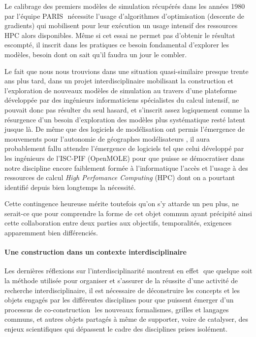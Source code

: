 Le calibrage des premiers modèles de simulation récupérés dans les années 1980 par l'équipe PARIS \autocites{Pumain1983,Pumain1989,Sanders1984}⁠ nécessite l'usage d'algorithmes d'optimisation (descente de gradients) qui mobilisent pour leur exécution un usage intensif des ressources HPC alors disponibles. Même si cet essai ne permet pas d'obtenir le résultat escompté, il inscrit dans les pratiques ce besoin fondamental d'explorer les modèles, besoin dont on sait qu'il faudra un jour le combler. 

Le fait que nous nous trouvions dans une situation quasi-similaire presque trente ans plus tard, dans un projet interdisciplinaire mobilisant la construction et l'exploration de nouveaux modèles de simulation au travers d'une plateforme développée par des ingénieurs informaticiens spécialistes du calcul intensif, ne pouvait donc pas résulter du seul hasard, et s'inscrit assez logiquement comme la résurgence d'un besoin d'exploration des modèles plus systématique resté latent jusque là. De même que des logiciels de modélisation ont permis l'émergence de mouvements pour l'autonomie de géographes modélisateurs \autocite{Banos2013}⁠, il aura probablement fallu attendre l'émergence de logiciels tel que celui développé par les ingénieurs de l'ISC-PIF (OpenMOLE) pour que puisse se démocratiser dans notre discipline encore faiblement formée à l'informatique l'accès et l'usage à des ressources de calcul \textit{High Perfomance Computing} (HPC) dont on a pourtant identifié depuis bien longtemps la nécessité. 

Cette contingence heureuse mérite toutefois qu'on s'y attarde un peu plus, ne serait-ce que pour comprendre la forme de cet objet commun ayant précipité ainsi cette collaboration entre deux parties aux objectifs, temporalités, exigences apparemment bien différenciés. 

\paragraph*{Une construction dans un contexte interdisciplinaire}

Les dernières réflexions sur l'interdisciplinarité montrent en effet \autocites{Pumain2005, Chapron2014}⁠ que quelque soit la méthode utilisée pour organiser et s'assurer de la réussite d'une activité de recherche interdisciplinaire, il est nécessaire de déconstruire les concepts et les objets engagés par les différentes disciplines pour que puissent émerger d'un processus de co-construction \autocite{Banos2013}⁠ les nouveaux formalismes, grilles et langages communs, et autres objets partagés à même de supporter, voire de catalyser, des enjeux scientifiques qui dépassent le cadre des disciplines prises isolément.

